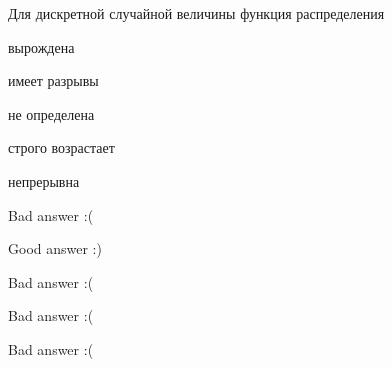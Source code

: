 
\begin{question}
Для дискретной случайной величины функция распределения
\begin{answerlist}
  \item вырождена
  \item имеет разрывы
  \item не определена
  \item строго возрастает
  \item непрерывна
\end{answerlist}
\end{question}

\begin{solution}
\begin{answerlist}
  \item Bad answer :(
  \item Good answer :)
  \item Bad answer :(
  \item Bad answer :(
  \item Bad answer :(
\end{answerlist}
\end{solution}

